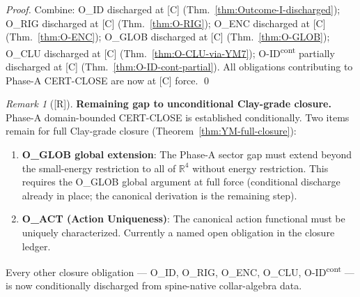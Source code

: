 \documentclass[12pt,oneside]{amsbook}
\theoremstyle{plain}
\theoremstyle{definition}
\theoremstyle{remark}
\newtheorem{remark}[theorem]{Remark}
\newcommand{\status}[1]{\textup{[#1]}}
\begin{document}
\begin{proof}
Combine: O\_ID discharged at [C] (Thm.~\ref{thm:Outcome-I-discharged});
O\_RIG discharged at [C] (Thm.~\ref{thm:O-RIG});
O\_ENC discharged at [C] (Thm.~\ref{thm:O-ENC});
O\_GLOB discharged at [C] (Thm.~\ref{thm:O-GLOB});
O\_CLU discharged at [C] (Thm.~\ref{thm:O-CLU-via-YM7});
O-ID\textsuperscript{cont} partially discharged at [C]
(Thm.~\ref{thm:O-ID-cont-partial}).
All obligations contributing to Phase-A CERT-CLOSE are now
at [C] force. \qed
\end{proof}

\begin{remark}[\status{R}]\label{rem:YM-remaining-for-clay}
\textbf{Remaining gap to unconditional Clay-grade closure.}
Phase-A domain-bounded CERT-CLOSE is established conditionally.
Two items remain for full Clay-grade closure
(Theorem~\ref{thm:YM-full-closure}):
\begin{enumerate}[label=\textup{(\arabic*)}]
 \item \textbf{O\_GLOB global extension}: The Phase-A sector gap
 must extend beyond the small-energy restriction to all of
 $\mathbb{R}^4$ without energy restriction. This requires the
 O\_GLOB global argument at full force (conditional discharge
 already in place; the canonical derivation is the remaining step).
 \item \textbf{O\_ACT (Action Uniqueness)}: The canonical action
 functional must be uniquely characterized. Currently a named
 open obligation in the closure ledger.
\end{enumerate}
Every other closure obligation --- O\_ID, O\_RIG, O\_ENC, O\_CLU,
O-ID\textsuperscript{cont} --- is now conditionally discharged from
spine-native collar-algebra data.
\end{remark}
\end{document}
